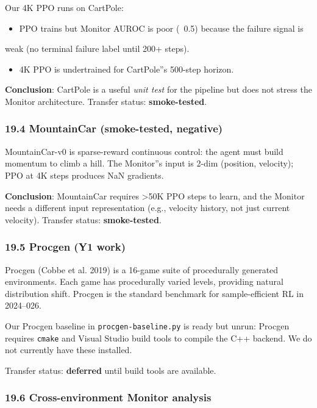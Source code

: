 \documentclass[11pt]{article}
\begin{document}
Our 4K PPO runs on CartPole:

\begin{itemize}
  \item PPO trains but Monitor AUROC is poor (~0.5) because the failure signal is
\end{itemize}

  weak (no terminal failure label until 200+ steps).
\begin{itemize}
  \item 4K PPO is undertrained for CartPole''s 500-step horizon.
\end{itemize}


\textbf{Conclusion}: CartPole is a useful \textit{unit test} for the pipeline but does
not stress the Monitor architecture. Transfer status: \textbf{smoke-tested}.

\subsubsection{19.4 MountainCar (smoke-tested, negative)}

MountainCar-v0 is sparse-reward continuous control: the agent must build
momentum to climb a hill. The Monitor''s input is 2-dim (position, velocity);
PPO at 4K steps produces NaN gradients.

\textbf{Conclusion}: MountainCar requires >50K PPO steps to learn, and the Monitor
needs a different input representation (e.g., velocity history, not just
current velocity). Transfer status: \textbf{smoke-tested}.

\subsubsection{19.5 Procgen (Y1 work)}

Procgen (Cobbe et al. 2019) is a 16-game suite of procedurally generated
environments. Each game has procedurally varied levels, providing natural
distribution shift. Procgen is the standard benchmark for sample-efficient
RL in 2024--026.

Our Procgen baseline in \texttt{procgen-baseline.py} is ready but unrun: Procgen
requires \texttt{cmake} and Visual Studio build tools to compile the C++ backend. We
do not currently have these installed.

Transfer status: \textbf{deferred} until build tools are available.

\subsubsection{19.6 Cross-environment Monitor analysis}
\end{document}
